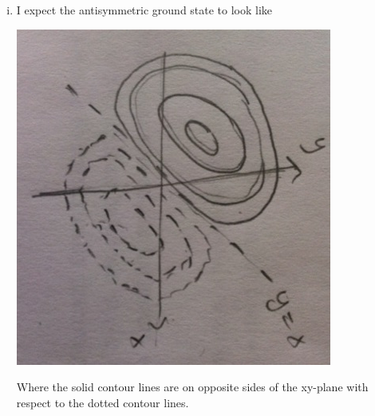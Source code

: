 \documentclass{article}
\begin{document}
\begin{enumerate}[i)]
  \item I expect the antisymmetric ground state to look like
    \begin{center}
    \includegraphics[scale=0.25]{prob2part7}
    \end{center}
    Where the solid contour lines are on opposite sides of the xy-plane with respect to the dotted contour lines. 
\end{enumerate}
\end{document}
